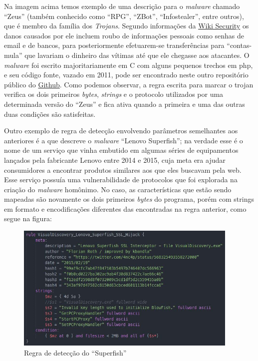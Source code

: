 Na imagem acima temos exemplo de uma descrição para o \textit{malware} chamado ``Zeus''
(também conhecido como ``RPG'', ``ZBot'', ``Infostealer'', entre outros), que é membro da
família dos \textit{Trojans}. Segundo informações da \href{www.wiki-security.com}{Wiki Security}\citeyear{wikisecurity} os danos causados por ele incluem roubo de informações pessoais como senhas de email e de bancos, para posteriormente efetuarem-se transferências para ``contas-mula'' que lavariam o dinheiro das vítimas até
que ele chegasse aos atacantes. O \textit{malware} foi escrito majoritariamente em C
com alguns pequenos trechos em php, e seu código fonte, vazado em 2011, pode
ser encontrado neste outro repositório público do \href{https://github.com/Visgean/Zeus}{Github}.
Como podemos observar, a regra escrita para marcar o trojan verifica os dois primeiros \textit{bytes}, \textit{strings} e o protocolo utilizados por uma determinada versão do ``Zeus'' e fica ativa quando a primeira e uma das outras duas condições são satisfeitas.

Outro exemplo de regra de detecção envolvendo parâmetros semelhantes aos anteriores é a que descreve o \textit{malware} ``Lenovo Superfish''\citeyear{lenovosuperfish}; na verdade esse é o nome de um serviço que vinha embutido em algumas séries de equipamentos lançados pela fabricante Lenovo entre 2014 e 2015, cuja meta era ajudar consumidores a encontrar produtos similares aos que eles buscavam pela web. Esse serviço possuía uma vulnerabilidade de protocolos que foi explorada na criação do \textit{malware} homônimo. No caso, as características que estão sendo mapeadas são novamente os dois primeiros \textit{bytes} do programa, porém com strings em formato e encodificações diferentes das encontradas na regra anterior, como segue na figura:

\begin{figure}[h]
	\centering
	\includegraphics[width=0.95\textwidth]{figs/superfish}
	\caption{Regra de detecção do ``Superfish''}
	\label{fig:superfish}
\end{figure}

